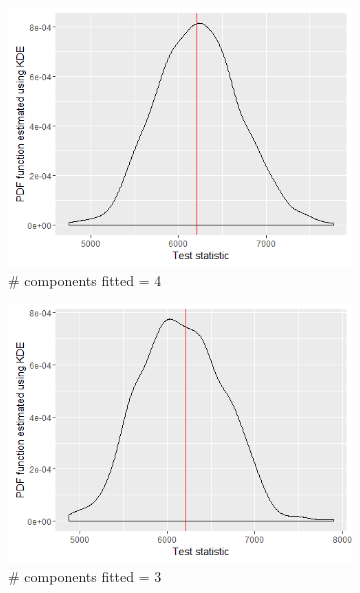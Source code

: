 \begin{figure}[!htb]
\begin{subfigure}[b]{0.4\textwidth}
		\includegraphics[width=\textwidth]{mainmatter/chapter_5_simulation_study/ppc_5wellsep4comp.png}
          \caption{\label{fig : ppc_5wellsep4comp}\# components fitted = 4}
	\end{subfigure}
	\begin{subfigure}[b]{0.4\textwidth}
		\includegraphics[width=\textwidth]{mainmatter/chapter_5_simulation_study/ppc_5wellsep3comp.png}
          \caption{\label{fig : ppc_5wellsep3comp}\# components fitted = 3}
	\end{subfigure}
	\begin{subfigure}[b]{0.4\textwidth}

\end{subfigure}
\end{figure}
